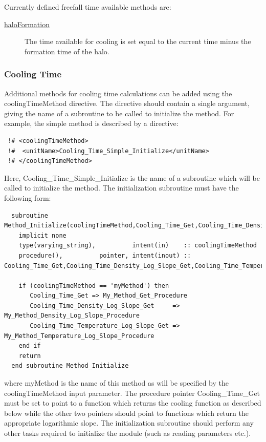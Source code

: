 Currently defined freefall time available methods are:
\begin{description}
 \item [\hyperlink{cooling.freefall_time_available.halo_formation.F90:freefall_times_available_halo_formation:freefall_time_available_halo_formation}{{\normalfont \ttfamily haloFormation}}] The time available for cooling is set equal to the current time minus the formation time of the halo.
\end{description}

\subsubsection{Cooling Time}

Additional methods for cooling time calculations can be added using the {\normalfont \ttfamily coolingTimeMethod} directive. The directive should contain a single argument, giving the name of a subroutine to be called to initialize the method. For example, the {\normalfont \ttfamily simple} method is described by a directive:
\begin{verbatim}
 !# <coolingTimeMethod>
 !#  <unitName>Cooling_Time_Simple_Initialize</unitName>
 !# </coolingTimeMethod>
\end{verbatim}
Here, {\normalfont \ttfamily Cooling\_Time\_Simple\_Initialize} is the name of a subroutine which will be called to initialize the method. The initialization subroutine must have the following form:
\begin{verbatim}
  subroutine Method_Initialize(coolingTimeMethod,Cooling_Time_Get,Cooling_Time_Density_Log_Slope_Get,Cooling_Time_Temperature_Log_Slope_Get)
    implicit none
    type(varying_string),          intent(in)    :: coolingTimeMethod
    procedure(),          pointer, intent(inout) :: Cooling_Time_Get,Cooling_Time_Density_Log_Slope_Get,Cooling_Time_Temperature_Log_Slope_Get
    
    if (coolingTimeMethod == 'myMethod') then
       Cooling_Time_Get => My_Method_Get_Procedure
       Cooling_Time_Density_Log_Slope_Get     => My_Method_Density_Log_Slope_Procedure
       Cooling_Time_Temperature_Log_Slope_Get => My_Method_Temperature_Log_Slope_Procedure
    end if
    return
  end subroutine Method_Initialize
\end{verbatim}
where {\normalfont \ttfamily myMethod} is the name of this method as will be specified by the {\normalfont \ttfamily coolingTimeMethod} input parameter. The procedure pointer {\normalfont \ttfamily Cooling\_Time\_Get} must be set to point to a function which returns the cooling function as described below while the other two pointers should point to functions which return the appropriate logarithmic slope. The initialization subroutine should perform any other tasks required to initialize the module (such as reading parameters etc.).

